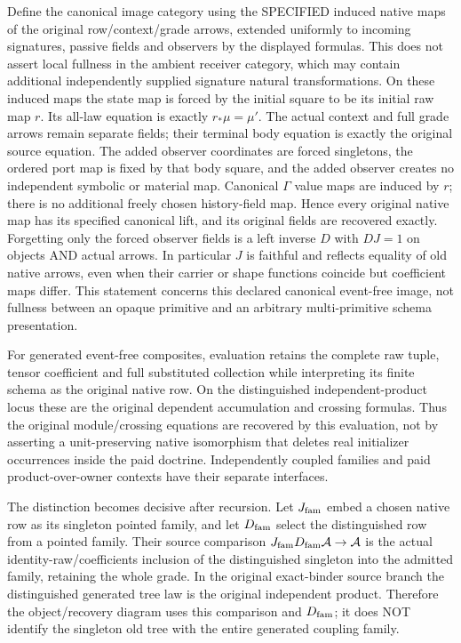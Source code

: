 \documentclass[11pt]{article}
\begin{document}
Define the canonical image category using the SPECIFIED induced native maps of the original row/context/grade arrows, extended uniformly to incoming signatures, passive fields and observers by the displayed formulas. This does not assert local fullness in the ambient receiver category, which may contain additional independently supplied signature natural transformations. On these induced maps the state map is forced by the initial square to be its initial raw map $r$. Its all-law equation is exactly $r_*\mu=\mu'$. The actual context and full grade arrows remain separate fields; their terminal body equation is exactly the original source equation. The added observer coordinates are forced singletons, the ordered port map is fixed by that body square, and the added observer creates no independent symbolic or material map. Canonical $\Gamma$ value maps are induced by $r$; there is no additional freely chosen history-field map. Hence every original native map has its specified canonical lift, and its original fields are recovered exactly. Forgetting only the forced observer fields is a left inverse $D$ with $DJ=1$ on objects AND actual arrows. In particular $J$ is faithful and reflects equality of old native arrows, even when their carrier or shape functions coincide but coefficient maps differ. This statement concerns this declared canonical event-free image, not fullness between an opaque primitive and an arbitrary multi-primitive schema presentation.

For generated event-free composites, evaluation retains the complete raw tuple, tensor coefficient and full substituted collection while interpreting its finite schema as the original native row. On the distinguished independent-product locus these are the original dependent accumulation and crossing formulas. Thus the original module/crossing equations are recovered by this evaluation, not by asserting a unit-preserving native isomorphism that deletes real initializer occurrences inside the paid doctrine. Independently coupled families and paid product-over-owner contexts have their separate interfaces.

The distinction becomes decisive after recursion. Let $J_{\rm fam}$ embed a chosen native row as its singleton pointed family, and let $D_{\rm fam}$ select the distinguished row from a pointed family. Their source comparison $J_{\rm fam}D_{\rm fam}\mathcal A\to\mathcal A$ is the actual identity-raw/coefficients inclusion of the distinguished singleton into the admitted family, retaining the whole grade. In the original exact-binder source branch the distinguished generated tree law is the original independent product. Therefore the object/recovery diagram uses this comparison and $D_{\rm fam}$; it does NOT identify the singleton old tree with the entire generated coupling family.
\end{document}
